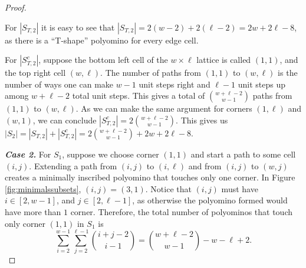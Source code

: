 \documentclass[12pt]{article}
\theoremstyle{plain}
\theoremstyle{definition}
\theoremstyle{remark}
\theoremstyle{definition}
\newcommand{\cell}[4]{\filldraw[gray!40] ( #1 , #2 ) rectangle ( #3 , #4 ); \draw[thick] ( #1 , #2 ) rectangle ( #3 , #4 );}
\begin{document}
\begin{proof}
\begin{center}
    \label{fig:T-shaped minimals}
\end{center}

For $|S_{T,2}|$ it is easy to see that $|S_{T,2}| = 2(w-2) + 2(\ell-2) = 2w+2\ell-8$, as there is a ``T-shape'' polyomino for every edge cell.

For $|S_{T,2}^c|$, suppose the bottom left cell of the $w \times \ell$ lattice is called $(1,1)$, and the top right cell $(w,\ell)$. The number of paths from $(1,1)$ to $(w,\ell)$ is the number of ways one can make $w-1$ unit steps right and $\ell -1$ unit steps up among $w + \ell -2$ total unit steps. This gives a total of $\binom{w+\ell-2}{w-1}$ paths from $(1,1)$ to $(w,\ell)$. As we can make the same argument for corners $(1,\ell)$ and $(w,1)$, we can conclude $|S_{T,2}^c| = 2\binom{w+\ell-2}{w-1}$. This gives us $|S_2| = |S_{T,2}| + |S_{T,2}^c| = 2\binom{w+\ell-2}{w-1} +2w+2\ell-8$.

\textbf{\textit{Case 2.}} For $S_1$, suppose we choose corner $(1,1)$ and start a path to some cell $(i,j)$. Extending a path from $(i,j)$ to $(i,\ell)$ and from $(i,j)$ to $(w,j)$ creates a minimally inscribed polyomino that touches only one corner. In Figure \ref{fig:minimalssubsets}, $(i,j)=(3,1)$. Notice that $(i,j)$ must have $i \in [2,w-1]$, and $j \in [2,\ell-1]$, as otherwise the polyomino formed would have more than $1$ corner. Therefore, the total number of polyominos that touch only corner $(1,1)$ in $S_1$ is 
$$\sum_{i=2}^{w-1}\sum_{j=2}^{\ell-1} \binom{i+j-2}{i-1} = \binom{w+\ell-2}{w-1}-w-\ell+2.$$


\end{proof}
\end{document}
